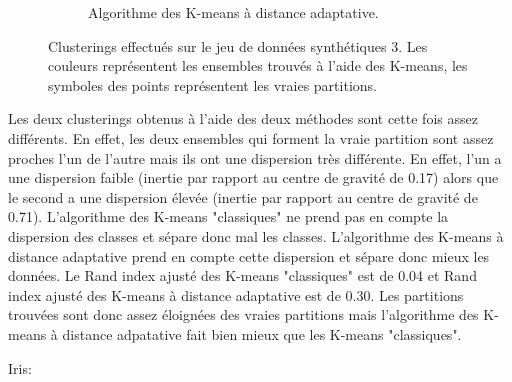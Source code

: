 \documentclass[a4paper,11pt,oneside,roman]{article}
\begin{document}
\begin{figure}
\begin{subfigure}{.5\textwidth}
          \caption{Algorithme des K-means à distance adaptative.}
        \end{subfigure}
        \caption{Clusterings effectués sur le jeu de données synthétiques 3. Les couleurs représentent les ensembles trouvés à l'aide des K-means, les symboles des points représentent les vraies partitions.}
        \label{fig_synth_3}
    \end{figure}
    Les deux clusterings obtenus à l'aide des deux méthodes sont cette fois assez différents.
    En effet, les deux ensembles qui forment la vraie partition sont assez proches l'un de l'autre mais ils ont une dispersion très différente.
    En effet, l'un a une dispersion faible (inertie par rapport au centre de gravité de 0.17) alors que le second a une dispersion élevée (inertie par rapport au centre de gravité de 0.71).
    L'algorithme des K-means "classiques" ne prend pas en compte la dispersion des classes et sépare donc mal les classes.
    L'algorithme des K-means à distance adaptative prend en compte cette dispersion et sépare donc mieux les données.
    Le Rand index ajusté des K-means "classiques" est de 0.04 et Rand index ajusté des K-means à distance adaptative est de 0.30.
    Les partitions trouvées sont donc assez éloignées des vraies partitions mais l'algorithme des K-means à distance adpatative fait bien mieux que les K-means "classiques".
    
    Iris:
\end{document}
